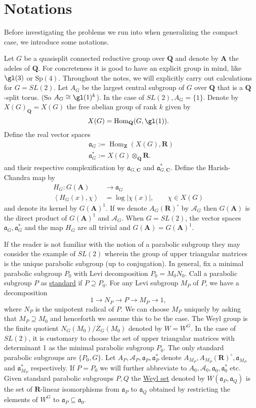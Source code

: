 \documentclass[11pt]{amsart}
\def\A{\mathbf A}
\def\C{\mathbf C}
\def\Q{\mathbf Q}
\def\R{\mathbf R}
\def\Z{\mathbf Z}
\def\AAA{\mathcal A}	%
\def\aaa{\mathfrak a}
\def\hom{\operatorname{Hom}}
\def\mod#1{\lvert #1 \rvert} %
\def\sprod#1#2{\left\langle #1 , #2 \right\rangle}  %
\theoremstyle{remark}
\begin{document}
\section{Notations} \label{sec_not1}

Before investigating the problems we run into when generalizing the compact case, we introduce some notations. 

Let $G$ be a quasisplit connected reductive group over $\Q$ and denote by $\A$ the adeles of $\Q$. For concreteness it is good to have an explicit group in mind, like $\gl(3)$ or $\text{Sp}(4)$. Throughout the notes, we will explicitly carry out calculations for $G = SL(2)$. Let $A_G$ be the largest central subgroup of $G$ over $\Q$ that is a $\Q$-split torus. (So $A_G \cong \gl(1)^k$). In the case of $SL(2), A_G = \{1\}$. Denote by $X(G)_\Q = X(G)$ the free abelian group of rank $k$ given by
\[ X(G) = \hom_\Q(G, \gl(1)). \]
Define the real vector spaces
\begin{align*}
	& \aaa_G := \hom_\Z(X(G), \R) \\
	& \aaa_G^* := X(G) \otimes_\Q \R.
\end{align*}
and their respective complexification by $\aaa_{G, \C}$ and $\aaa_{G, \C}^*$. 
Define the Harish-Chandra map by
\begin{align*}
	H_G : G(\A) & \to \aaa_G \\
	\sprod{H_G(x)}{\chi} & = \log \mod{\chi(x)}, \qquad \chi \in X(G)
\end{align*}
and denote its kernel by $G(\A)^1$. If we denote $A_G(\R)^\circ$ by $\AAA_G$ then $G(\A)$ is the direct product of $G(\A)^1$ and $\AAA_G$. When $G = SL(2)$, the vector spaces $\aaa_G, \aaa_G^*$ and the map $H_G$ are all trivial and $G(\A) = G(\A)^1$.

If the reader is not familiar with the notion of a parabolic subgroup they may consider the example of $SL(2)$ wherein the group of upper triangular matrices is the unique parabolic subgroup (up to conjugation). In general, fix a minimal parabolic subgroup $P_0$ with Levi decomposition $P_0 = M_0 N_0$. Call a parabolic subgroup $P$ as \underline{standard} if $P \supseteq P_0$. For any Levi subgroup $M_P$ of $P$, we have a decomposition
\[ 1 \to N_P \to P \to M_P \to 1, \]
where $N_P$ is the unipotent radical of $P$. We can choose $M_P$ uniquely by asking that \mbox{$M_P \supseteq M_0$} and henceforth we assume this to be the case. The Weyl group is the finite quotient $N_G(M_0)/Z_G(M_0)$ denoted by $W = W^G$. In the case of $SL(2)$, it is customary to choose the set of upper triangular matrices with determinant 1 as the minimal parabolic subgroup $P_0$. The only standard parabolic subgroups are $\{P_0, G\}$.
Let $A_P, \AAA_P, \aaa_P, \aaa_P^*$ denote $A_{M_P}, A_{M_P}(\R)^\circ, \aaa_{M_P}$ and $\aaa_{M_P}^*$ respectively. If $P = P_0$ we will further abbreviate to $A_0, \AAA_0, \aaa_0, \aaa_0^*$ etc. Given standard parabolic subgroups $P, Q$ the \underline{Weyl set} denoted by $W(\aaa_P, \aaa_Q)$ is the set of $\R$-linear isomorphisms from $\aaa_P$ to $\aaa_Q$ obtained by restricting the elements of $W^G$ to $\aaa_P \subseteq \aaa_0$. 
\end{document}
